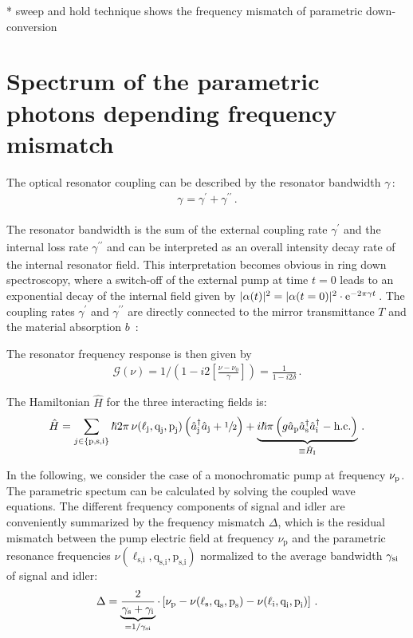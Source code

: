 \documentclass[aps,pra,showpacs,reprint,onecolumn,notitlepage]{revtex4-1}
\makeatletter
\newcommand{\tx}[1]{\textnormal{#1}}
\def\@fnsymbol#1{\ensuremath{\ifcase#1\or *\or \dagger\or \ddagger\or
   \mathsection\or \mathparagraph\or \|\or **\or \dagger\dagger
   \or \ddagger\ddagger \else\@ctrerr\fi}}
\newcommand{\ssym}[1]{^{\@fnsymbol{#1}}}
\makeatother
\begin{document}
* sweep and hold technique shows the frequency mismatch of parametric down-conversion


\section{Spectrum of the parametric photons depending frequency mismatch}
The optical resonator coupling can be described by the resonator bandwidth $\gamma\,$:
\begin{align}
	\gamma_\textrm{} = \gamma^{\prime}_\textrm{} + \gamma^{\prime\prime}_\textrm{} \, .
	\label{eq:resbandwidth}
\end{align}

The resonator bandwidth is the sum of the external coupling rate $\gamma^{\prime}_\textrm{}$ and the internal loss rate $\gamma^{\prime\prime}_\textrm{}$ and can be interpreted as an overall intensity decay rate of the internal resonator field. This interpretation becomes obvious in ring down spectroscopy, where a switch-off of the external pump at time $t=0$ leads to an exponential decay of the internal field given by $|\alpha(t)|^2 = |\alpha(t=0)|^2 \cdot \tx{e}^{- 2 \pi \gamma t}\,$. The coupling rates $\gamma^\prime$ and $\gamma^{\prime\prime}$ are directly connected to the mirror transmittance $T$ and the material absorption $b\,$ \cite{Bachor2004}:

The resonator frequency response is then given by
\begin{align}
	\mathcal{G} (\nu) = 1 / \left( 1 - i 2 {\left[ \frac{\nu-\nu_0}{\gamma} \right]}  \right) = \frac{1}{ {1 - i 2 \delta} } \,.
	\label{eq:cavityresponse}
\end{align}

The Hamiltonian $\hat{H}$ for the three interacting fields is:
\begin{align}
	\hat{H} = {\sum_{j \in \left\lbrace \tx{p,s,i} \right\rbrace}{\hslash 2 \pi \, \nu (\ell_\textrm{j},\textrm{q}_\textrm{j},\textrm{p}_\textrm{j}) \left( \hat{a}\ssym{2}_\tx{j} \hat{a}_\tx{j} + \sfrac{1}{2} \right)} }
	+ \underbrace{i \hslash \pi  \left( {g} \hat{a}_\tx{p}  \hat{a}_\tx{s}\ssym{2} \hat{a}_\tx{i}\ssym{2} - \tx{h.c.} \right) }_{ \equiv \hat{H}_\tx{I}} \,.
	\label{eq:HamiltonianPDC}
\end{align}

In the following, we consider the case of a monochromatic pump at frequency $\nu_\tx{p}$.  The parametric spectum can be calculated by solving the coupled wave equations. The different frequency components of signal and idler are conveniently summarized by the frequency mismatch $\Delta$, which is the residual mismatch between the pump electric field at frequency $\nu_\textrm{p}$ and the parametric resonance frequencies $\nu (\ell_\textrm{s,i},\textrm{q}_\textrm{s,i},\textrm{p}_\textrm{s,i})$ normalized to the average bandwidth $\gamma_\tx{si}$ of signal and idler:
\begin{align}
 	\Delta = \underbrace{\frac{2}{\gamma_\textrm{s}+\gamma_\textrm{i}} }_{ = 1 / \gamma_\tx{si}} \cdot \left[ \nu_\textrm{p} - \nu (\ell_\textrm{s},\textrm{q}_\textrm{s},	\textrm{p}_\textrm{s} ) - \nu (\ell_\textrm{i},\textrm{q}_\textrm{i},\textrm{p}_\textrm{i} ) \right] \,.
 	\label{eq:SPDCfrequ}
\end{align} 
\end{document}
